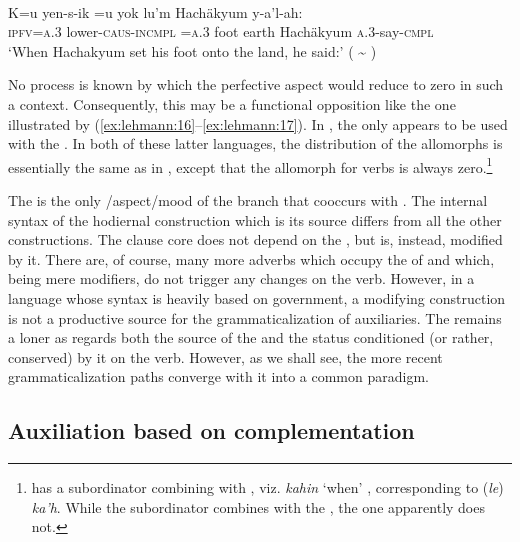 \documentclass[output=paper]{langsci/langscibook}
\begin{document}
\ea\label{ex:lehmann:21}
\\
\gll       K=u      yen-s-ik          =u    yok  lu’m    Hachäkyum    y-a’l-ah:\\
  \textsc{ipfv=a.3}  lower-\textsc{caus-incmpl }   \textsc{=a.3}    foot  earth    Hachäkyum    \textsc{a.3}{}-say-\textsc{cmpl}\\
\glt ‘When Hachakyum set his foot onto the land, he said:’ (\citealt[111]{Bruce1968} {\textasciitilde} \citeyear[19]{Bruce1974})
\z

No process is known by which the perfective aspect  would reduce to zero in such a context. Consequently, this may be a functional opposition like the one illustrated by (\ref{ex:lehmann:16}–\ref{ex:lehmann:17}). In , the  only appears to be used with the  . In both of these latter languages, the distribution of the allomorphs is essentially the same as in , except that the allomorph for  verbs is always zero.\footnote{ has a subordinator combining with , viz. \textit{kahin} ‘when’ \citep[100]{Bruce1968}, corresponding to  (\textit{le}) \textit{ka’h}. While the  subordinator combines with the  , the  one apparently does not.} 

The  is the only /aspect/mood  of the  branch that cooccurs with . The internal syntax of the hodiernal  construction which is its source differs from all the other  constructions. The clause core does not depend on the , but is, instead, modified by it. There are, of course, many more adverbs which occupy the  of  and which, being mere modifiers, do not trigger any changes on the verb. However, in a language whose syntax is heavily based on government, a modifying construction is not a productive source for the grammaticalization of auxiliaries. The  remains a loner as regards both the source of the  and the status conditioned (or rather, conserved) by it on the verb. However, as we shall see, the more recent grammaticalization paths converge with it into a common paradigm.

\subsection{Auxiliation based on complementation}\label{sec:lehmann:4.7}
\end{document}
